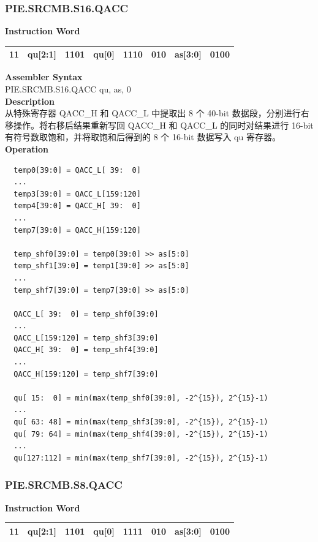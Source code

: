 \newpage
\subsubsection{PIE.SRCMB.S16.QACC}\label{instruction:PIESRCMBS16QACC}
\setlength\tabcolsep{6pt}
\textbf{Instruction Word} \\
\begin{tabular}{|c|c|c|c|c|c|c|c|}
	\hline
	11 & qu[2:1] & 1101 & qu[0] & 1110 & 010 & as[3:0] & 0100 \\
	\hline
\end{tabular}

\textbf{Assembler Syntax} \\
PIE.SRCMB.S16.QACC qu, as, 0 \\
\textbf{Description} \\
从特殊寄存器 QACC\_H 和 QACC\_L 中提取出 8 个 40-bit 数据段，分别进行右移操作。将右移后结果重新写回 QACC\_H 和 QACC\_L 的同时对结果进行 16-bit 有符号数取饱和，并将取饱和后得到的 8 个 16-bit 数据写入 qu 寄存器。\\
\textbf{Operation}
\begin{lstlisting}
  temp0[39:0] = QACC_L[ 39:  0]
  ...
  temp3[39:0] = QACC_L[159:120]
  temp4[39:0] = QACC_H[ 39:  0]
  ...
  temp7[39:0] = QACC_H[159:120]

  temp_shf0[39:0] = temp0[39:0] >> as[5:0]
  temp_shf1[39:0] = temp1[39:0] >> as[5:0]
  ...
  temp_shf7[39:0] = temp7[39:0] >> as[5:0]

  QACC_L[ 39:  0] = temp_shf0[39:0]
  ...
  QACC_L[159:120] = temp_shf3[39:0]
  QACC_H[ 39:  0] = temp_shf4[39:0]
  ...
  QACC_H[159:120] = temp_shf7[39:0]

  qu[ 15:  0] = min(max(temp_shf0[39:0], -2^{15}), 2^{15}-1)
  ...
  qu[ 63: 48] = min(max(temp_shf3[39:0], -2^{15}), 2^{15}-1)
  qu[ 79: 64] = min(max(temp_shf4[39:0], -2^{15}), 2^{15}-1)
  ...
  qu[127:112] = min(max(temp_shf7[39:0], -2^{15}), 2^{15}-1)
\end{lstlisting}

\newpage
\subsubsection{PIE.SRCMB.S8.QACC}\label{instruction:PIESRCMBS8QACC}
\setlength\tabcolsep{6pt}
\textbf{Instruction Word} \\
\begin{tabular}{|c|c|c|c|c|c|c|c|}
	\hline
	11 & qu[2:1] & 1101 & qu[0] & 1111 & 010 & as[3:0] & 0100 \\
	\hline
\end{tabular}

